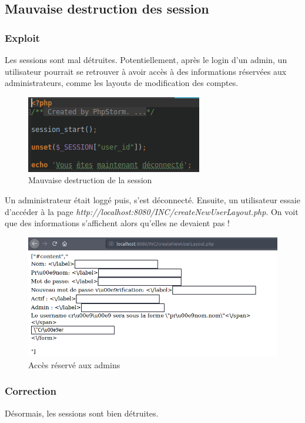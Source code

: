 \documentclass[12pt]{article}
\begin{document}
\subsection{Mauvaise destruction des session}
\subsubsection{Exploit}
Les sessions sont mal détruites. Potentiellement, après le login d'un admin, un utilisateur pourrait se retrouver à avoir accès à des informations réservées aux administrateurs, comme les layouts de modification des comptes. 
\begin{figure}[H]
\centering
\includegraphics[width=\linewidth]{images/unset.png}
\caption{Mauvaise destruction de la session}
\end{figure}

Un administrateur était loggé puis, s'est déconnecté. Ensuite, un utilisateur essaie d'accéder à la page \textit{http://localhost:8080/INC/createNewUserLayout.php}. On voit que des informations s'affichent alors qu'elles ne devaient pas !
\begin{figure}[H]
\centering
\includegraphics[width=\linewidth]{images/exploitMauvaiseDestrucSess.png}
\caption{Accès réservé aux admins}
\end{figure}

\subsubsection{Correction}
Désormais, les sessions sont bien détruites.
\end{document}
